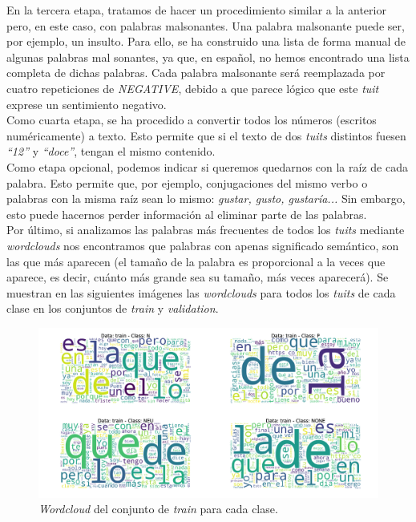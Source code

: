 \documentclass[11pt]{article}
\begin{document}
En la tercera etapa, tratamos de hacer un procedimiento similar a la anterior pero, en este caso, con palabras malsonantes. Una palabra malsonante puede ser, por ejemplo, un insulto. Para ello, se ha construido una lista de forma manual de algunas palabras mal sonantes, ya que, en español, no hemos encontrado una lista completa de dichas palabras. Cada palabra malsonante será reemplazada por cuatro repeticiones de \textit{NEGATIVE}, debido a que parece lógico que este \textit{tuit} exprese un sentimiento negativo.
\\

Como cuarta etapa, se ha procedido a convertir todos los números (escritos numéricamente) a texto. Esto permite que si el texto de dos \textit{tuits} distintos fuesen \textit{``12''} y \textit{``doce''}, tengan el mismo contenido.
\\

Como etapa opcional, podemos indicar si queremos quedarnos con la raíz de cada palabra. Esto permite que, por ejemplo, conjugaciones del mismo verbo o palabras con la misma raíz sean lo mismo: \textit{gustar, gusto, gustaría...} Sin embargo, esto puede hacernos perder información al eliminar parte de las palabras.
\\

Por último, si analizamos las palabras más frecuentes de todos los \textit{tuits} mediante \textit{wordclouds} nos encontramos que palabras con apenas significado semántico, son las que más aparecen (el tamaño de la palabra es proporcional a la veces que aparece, es decir, cuánto más grande sea su tamaño, más veces aparecerá). Se muestran en las siguientes imágenes las \textit{wordclouds} para todos los \textit{tuits} de cada clase en los conjuntos de \textit{train} y \textit{validation}.

\begin{figure}[H]
\includegraphics[width=\linewidth]{images/wordcloud/wordcloud_train.png}
\caption{\textit{Wordcloud} del conjunto de \textit{train} para cada clase.}
\end{figure}
\end{document}
